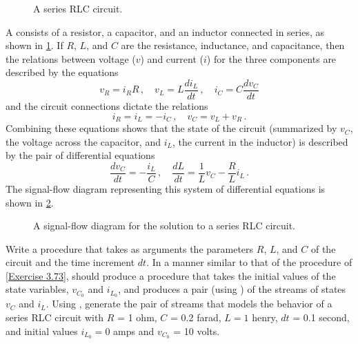 \begin{figure}[tb]
	\centering
	
	\caption{
		A series RLC circuit.
	}
	\label{Figure 3.36}
\end{figure}



\begin{exercise}
	\label{Exercise 3.80}
	A  consists of a resistor, a capacitor, and an inductor connected in series, as shown in \cref{Figure 3.36}.
	If \( R \), \( L \), and \( C \) are the resistance, inductance, and capacitance, then the relations between voltage (\( v \)) and current (\( i \)) for the three components are described by the equations
	\[
		v_R = i_R R \,, \quad
		v_L = L \frac{d i_L}{d t} \,, \quad
		i_C = C \frac{d v_C}{d t}
	\]
	and the circuit connections dictate the relations
	\[
		i_R = i_L = -i_C \,, \quad
		v_C = v_L + v_R \,.
	\]
	Combining these equations shows that the state of the circuit (summarized by \( v_C \), the voltage across the capacitor, and \( i_L \), the current in the inductor) is described by the pair of differential equations
	\[
		\frac{d v_C}{d t} = - \frac{i_L}{C} \,,
		\quad
		\frac{d L}{d t} = \frac{1}{L} v_C - \frac{R}{L} i_L \,.
		\]
	The signal-flow diagram representing this system of differential equations is shown in \cref{Figure 3.37}.
\end{exercise}



\begin{figure}[tb]
	\centering
	
	\caption{
		A signal-flow diagram for the solution to a series RLC circuit.
	}
	\label{Figure 3.37}
\end{figure}



\begin{exercise}
	Write a procedure  that takes as arguments the parameters \( R \), \( L \), and \( C \) of the circuit and the time increment \( dt \).
	In a manner similar to that of the  procedure of \cref{Exercise 3.73},  should produce a procedure that takes the initial values of the state variables, \( v_{C_0} \) and \( i_{L_0} \), and produces a pair (using ) of the streams of states \( v_C \) and \( i_L \).
	Using , generate the pair of streams that models the behavior of a series RLC circuit with \( R \) = 1 ohm, \( C \) = 0.2 farad, \( L = 1 \) henry, \( dt \) = 0.1 second, and initial values \( i_{L_0} = 0 \) amps and \( v_{C_0} \) = 10 volts.
\end{exercise}



